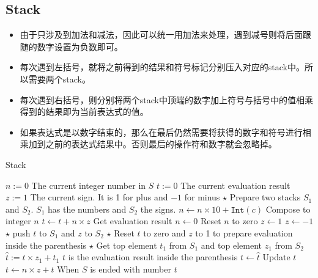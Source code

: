 \subsection{Stack}
\begin{CJK*}{UTF8}{gbsn}
\begin{itemize}
\item 由于只涉及到加法和减法，因此可以统一用加法来处理，遇到减号则将后面跟随的数字设置为负数即可。
\item 每次遇到左括号，就将之前得到的结果和符号标记分别压入对应的stack中。所以需要两个stack。
\item 每次遇到右括号，则分别将两个stack中顶端的数字加上符号与括号中的值相乘得到的结果即为当前表达式的值。
\item 如果表达式是以数字结束的，那么在最后仍然需要将获得的数字和符号进行相乘加到之前的表达式结果中。否则最后的操作符和数字就会忽略掉。
\end{itemize}
\end{CJK*}
\setcounter{algorithm}{0}
\begin{algorithm}[H]
\caption{Stack}
\begin{algorithmic}[1]
\State $n:=0$ \Comment The current integer number in $S$
\State $t:=0$ \Comment The current evaluation result
\State $z:=1$ \Comment The current sign. It is 1 for plus and $-1$ for minus
\State $\star$ Prepare two stacks $S_1$ and $S_2$. $S_1$ has the numbers and $S_2$ the signs.
\State $n\gets n\times 10 + \texttt{Int}(c)$ \Comment Compose to integer $n$
\Else
\State $t\gets t+n\times z$ \Comment Get evaluation result 
\State $n\gets 0$ \Comment Reset $n$ to zero
\State $z\gets 1$ 
\State $z\gets -1$
\State $\star$ push $t$ to $S_1$ and $z$ to $S_2$
\State $\star$ Reset $t$ to zero and $z$ to 1 to prepare evaluation inside the parenthesis
\State $\star$ Get top element $t_1$ from $S_1$ and top element $z_1$ from $S_2$
\State $\hat{t}:=t\times z_1 + t_1$ \Comment $t$ is the evaluation result inside the parenthesis
\State $t\gets \hat{t}$ \Comment Update $t$
\EndIf
\EndIf
\EndFor
\State $t\gets n\times z +t$ \Comment When $S$ is ended with number
\State \Return $t$
\EndProcedure
\end{algorithmic}
\end{algorithm}
\setcounter{lstlisting}{0}

